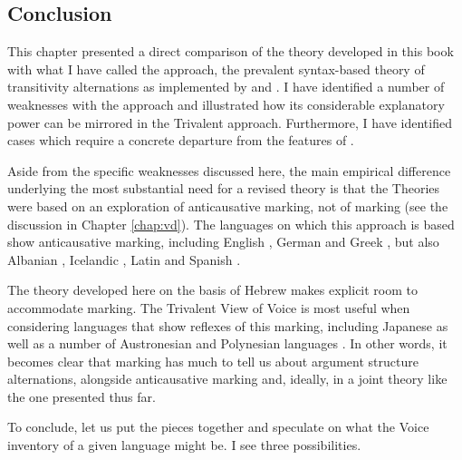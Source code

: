 \begin{exe}
\begin{xlist}
\begin{exe}
\begin{exe}
\begin{xlist}
\begin{exe}
\begin{exe}
\begin{exe}
\begin{exe}
\begin{exe}
\begin{xlist}
\begin{exe}
\begin{exe}
\begin{xlist}
\begin{exe}
\begin{xlist}
\begin{exe}
\begin{xlist}
\begin{exe}
\begin{xlist}
\section{Conclusion} \label{aas:conc}
This chapter presented a direct comparison of the theory developed in this book with what I have called the  approach, the prevalent syntax-based theory of transitivity alternations as implemented by \cite{schaefer08,schaefer17oup} and \cite{layering15}. I have identified a number of weaknesses with the  approach and illustrated how its considerable explanatory power can be mirrored in the Trivalent approach. Furthermore, I have identified cases which require a concrete departure from the features of .

Aside from the specific weaknesses discussed here, the main empirical difference underlying the most substantial need for a revised theory is that the  Theories were based on an exploration of anticausative marking, not of  marking (see the discussion in Chapter \ref{chap:vd}). The languages on which this approach is based show anticausative marking, including English \citep{myler16mit}, German \citep{schaefer17oup} and Greek \citep{spathasetal15}, but also Albanian \citep{kallulli13}, Icelandic \citep{wood15springer}, Latin \citep{embick04,kastnerzu17} and Spanish \citep{schaefervivanco16}.

The theory developed here on the basis of Hebrew makes explicit room to accommodate  marking. The Trivalent View of Voice is most useful when considering languages that show reflexes of this marking, including Japanese \citep{oseki17nyu} as well as a number of Austronesian and Polynesian languages \citep{nie17}. In other words, it becomes clear that  marking has much to tell us about argument structure alternations, alongside anticausative marking and, ideally, in a joint theory like the one presented thus far.

To conclude, let us put the pieces together and speculate on what the Voice inventory of a given language might be. I see three possibilities.


\end{xlist}
\end{exe}
\end{xlist}
\end{exe}
\end{xlist}
\end{exe}
\end{xlist}
\end{exe}
\end{exe}
\end{xlist}
\end{exe}
\end{exe}
\end{exe}
\end{exe}
\end{exe}
\end{xlist}
\end{exe}
\end{exe}
\end{xlist}
\end{exe}
